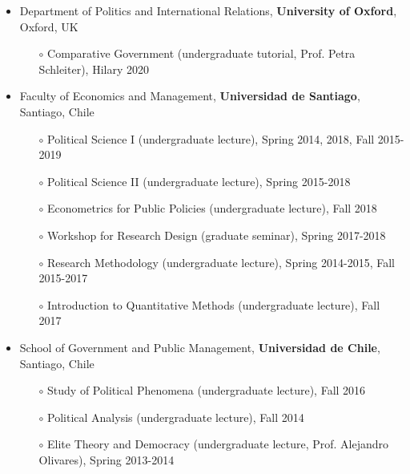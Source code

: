 \begin{publications}

\begin{itemize}
\item{\small Department of Politics and International Relations, {\bfseries University of Oxford}, Oxford, UK}
\begin{itemize}
\item[$\circ$]{\small Comparative Government (undergraduate tutorial, Prof. Petra Schleiter), Hilary 2020}
\end{itemize}
\item{\small Faculty of Economics and Management, {\bfseries Universidad de Santiago}, Santiago, Chile}
\begin{itemize}
\item[$\circ$]{\small Political Science I (undergraduate lecture), Spring 2014, 2018, Fall 2015-2019}
\item[$\circ$]{\small Political Science II (undergraduate lecture), Spring 2015-2018}
\item[$\circ$]{\small Econometrics for Public Policies (undergraduate lecture), Fall 2018}
\item[$\circ$]{\small Workshop for Research Design (graduate seminar), Spring 2017-2018}
\item[$\circ$]{\small Research Methodology (undergraduate lecture), Spring 2014-2015, Fall 2015-2017}
\item[$\circ$]{\small Introduction to Quantitative Methods (undergraduate lecture), Fall 2017}
\end{itemize}
\item{\small School of Government and Public Management, {\bfseries Universidad de Chile}, Santiago, Chile}
\begin{itemize}
\item[$\circ$]{\small Study of Political Phenomena (undergraduate lecture), Fall 2016}
\item[$\circ$]{\small Political Analysis (undergraduate lecture), Fall 2014}
\item[$\circ$]{\small Elite Theory and Democracy (undergraduate lecture, Prof. Alejandro Olivares), Spring 2013-2014}
\end{itemize}
\end{itemize}

\vspace{1mm}
\end{publications}
